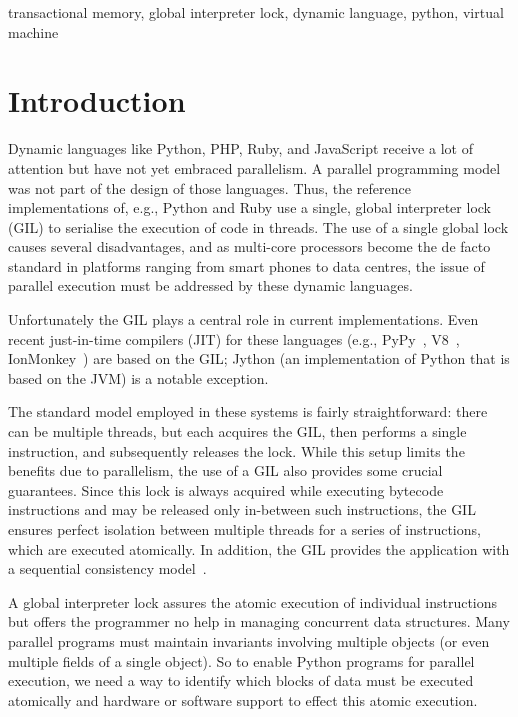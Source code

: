\documentclass{sigplanconf}
\begin{document}


\keywords
transactional memory, global interpreter lock, dynamic language,
python, virtual machine


\section{Introduction}


Dynamic languages like Python, PHP, Ruby, and JavaScript receive a lot
of attention but have not yet embraced parallelism. A parallel
programming model was not part of the design of those languages. Thus,
the reference implementations of, e.g., Python and Ruby use a single,
global interpreter lock (GIL) to serialise the execution of code in
threads. The use of a single global lock causes several disadvantages,
and as multi-core processors become the de facto standard in platforms
ranging from smart phones to data centres, the issue of parallel
execution must be addressed by these dynamic languages.

Unfortunately the GIL plays a central role in current
implementations. Even recent just-in-time compilers (JIT) for these
languages (e.g., PyPy~\cite{cfbolz09}, V8~\cite{kevin10},
IonMonkey~\cite{ionmonkey}) are based on the GIL; Jython (an
implementation of Python that is based on the JVM) is a notable
exception.

The standard model employed in these systems is fairly
straightforward: there can be multiple threads, but each acquires the
GIL, then performs a single instruction, and subsequently releases the
lock.  While this setup limits the benefits due to parallelism,
the use of a GIL also provides
some crucial guarantees. Since this lock is always acquired while
executing bytecode instructions and may be released only in-between
such instructions, the GIL ensures perfect isolation between multiple
threads for a series of instructions, which are executed atomically.
In addition, the GIL provides the application with a sequential
consistency model~\cite{lamport79}.

A global interpreter lock assures the atomic execution of individual
instructions but offers the programmer no help in managing concurrent
data structures. Many parallel programs must maintain invariants
involving multiple objects (or even multiple fields of a single
object).  So to enable Python programs for parallel execution, we need
a way to identify which blocks of data must be executed atomically and
hardware or software support to effect this atomic execution.
\end{document}
